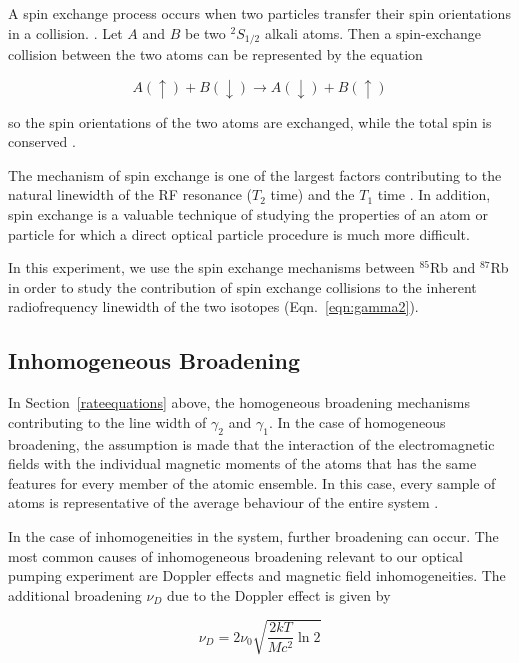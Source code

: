 A spin exchange process occurs when two particles transfer their spin orientations in a collision. \cite{bernheim}. Let $A$ and $B$ be two $^2S_{1/2}$
alkali atoms. Then a spin-exchange collision between the two atoms
can be represented by the equation

\begin{equation}
A(\uparrow) + B(\downarrow) \rightarrow A(\downarrow) + B(\uparrow)
\end{equation}

so the spin orientations of the two atoms are exchanged, while the
total spin is conserved \cite{happer}.  

The mechanism of spin exchange is one of the largest factors
contributing to the natural linewidth of the RF resonance ($T_2$ time) and
the $T_1$ time \cite{vanier}. In addition, spin exchange is a valuable
technique of studying the properties of an atom or particle for which
a direct optical particle procedure is much more difficult.

In this experiment, we use the spin exchange mechanisms between
$^{85}$Rb and $^{87}$Rb in order to study the contribution of spin
exchange collisions to the inherent radiofrequency linewidth of the two isotopes
(Eqn.~\ref{eqn:gamma2}).

\subsection{Inhomogeneous Broadening}\label{inhomogeneousbroadening}

In Section~\ref{rateequations} above, the homogeneous broadening
mechanisms contributing to the line width of $\gamma_2$ and
$\gamma_1$. In the case of homogeneous broadening, the assumption is
made that the interaction of the electromagnetic fields with the
individual magnetic moments of the atoms that has the same features
for every member of the atomic ensemble. In this case, every sample of
atoms is representative of the average behaviour of the entire system
\cite{vanier}. 

In the case of inhomogeneities in the system, further broadening can
occur. The most common causes of inhomogeneous broadening relevant to
our optical pumping experiment are Doppler effects and magnetic field
inhomogeneities. The additional broadening $\nu_D$ due to the Doppler effect
is given by

\begin{equation}
\nu_D = 2\nu_0\sqrt{\frac{2 k T}{M c^2}\ln{2}}
\end{equation}

